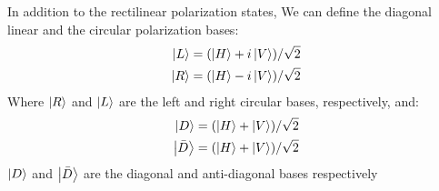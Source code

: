 	In addition to the rectilinear polarization states, We can define the diagonal linear and
	the circular polarization bases: 
	\begin{equation}
		\begin{split}
			\ket{L}=(\ket{H}+i\ket{V})/\sqrt{2} \\
			\ket{R}=(\ket{H}-i\ket{V})/\sqrt{2}
		\end{split}
	\end{equation}
	Where $\ket{R}$ and $\ket{L}$ are the left and right circular bases, respectively, and:
	\begin{equation}
		\begin{split}
			\ket{D}=(\ket{H}+\ket{V})/\sqrt{2}\\
			\ket{\bar{D}}=(\ket{H}+\ket{V})/\sqrt{2}
		\end{split}
	\end{equation}
	$\ket{D}$ and $\ket{\bar{D}}$ are the diagonal and anti-diagonal bases respectively
	
